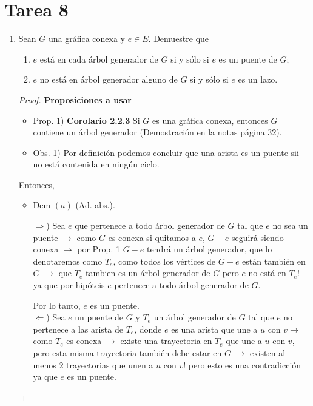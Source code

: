 \documentclass{article}
\begin{document}
\section*{\LARGE{Tarea 8}}
\begin{enumerate}
  \item Sean $G$ una gr\'afica conexa y $e \in E$.   Demuestre que
    \begin{enumerate}
      \item $e$ est\'a en cada \'arbol generador de $G$ si y s\'olo si $e$ es un puente
      de $G$;
      \item $e$ no est\'a en \'arbol generador alguno de $G$ si y s\'olo si $e$ es un lazo.
    \end{enumerate}

    \begin{proof}
      \textbf{Proposiciones a usar}
      \begin{itemize}
        \item Prop. 1) \textbf{Corolario 2.2.3} Si $G$ es una gráfica conexa, entonces $G$ contiene un árbol generador (Demostración en la notas página 32).
        \item Obs. 1) Por definición podemos concluir que una arista es un puente sii no está contenida en ningún ciclo.
      \end{itemize}

      Entonces,
      \begin{itemize}
        \item Dem $(a)$ (Ad. abs.).

          $\Longrightarrow$) Sea $e$ que pertenece a todo árbol generador de $G$ tal que $e$ no sea un puente $\rightarrow$ como $G$ es conexa si quitamos a $e$, $G-e$ seguirá siendo conexa $\rightarrow$ por Prop. 1 $G-e$ tendrá un árbol generador, que lo denotaremos como $T_e$, como todos los vértices de $G-e$ están también en $G$ $\rightarrow$ que $T_e$ tambien es un árbol generador de $G$ pero $e$ no está en $T_e$! ya que por hipóteis $e$ pertenece a todo árbol generador de $G$.

          Por lo tanto, $e$ es un puente. \\

          $\Longleftarrow$) Sea $e$ un puente de $G$ y $T_e$ un árbol generador de $G$ tal que $e$ no pertenece a las arista de $T_e$, donde $e$ es una arista que une a $u$ con $v \rightarrow$ como $T_e$ es conexa $\rightarrow$ existe una trayectoria en $T_e$ que une a $u$ con $v$, pero esta misma trayectoria también debe estar en $G$ $\rightarrow$ existen al menos 2 trayectorias que unen a $u$ con  $v$! pero esto es una contradicción ya que $e$ es un puente. \\


\end{itemize}
\end{proof}
\end{enumerate}
\end{document}
